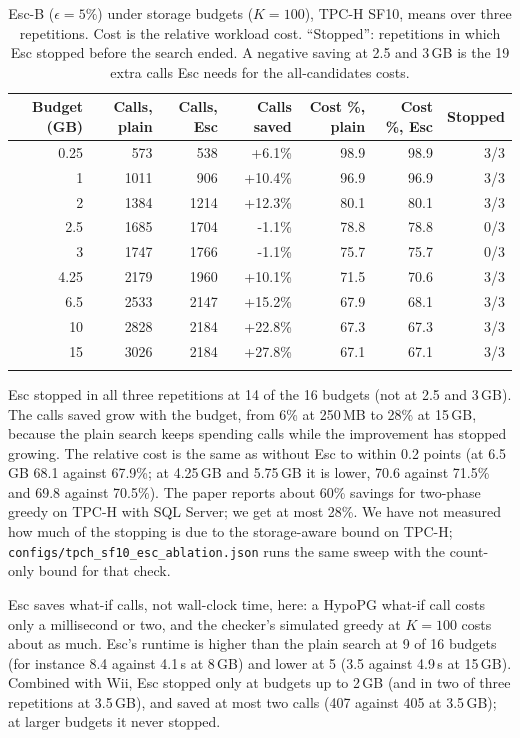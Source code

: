 \documentclass[11pt,a4paper]{article}
\begin{document}
\begin{table}[h]\centering\small
\begin{tabular}{rrrrrrr}\toprule
Budget (GB) & Calls, plain & Calls, Esc & Calls saved & Cost \%, plain & Cost \%, Esc & Stopped\\\midrule
0.25 & 573 & 538 & +6.1\% & 98.9 & 98.9 & 3/3\\
1 & 1011 & 906 & +10.4\% & 96.9 & 96.9 & 3/3\\
2 & 1384 & 1214 & +12.3\% & 80.1 & 80.1 & 3/3\\
2.5 & 1685 & 1704 & -1.1\% & 78.8 & 78.8 & 0/3\\
3 & 1747 & 1766 & -1.1\% & 75.7 & 75.7 & 0/3\\
4.25 & 2179 & 1960 & +10.1\% & 71.5 & 70.6 & 3/3\\
6.5 & 2533 & 2147 & +15.2\% & 67.9 & 68.1 & 3/3\\
10 & 2828 & 2184 & +22.8\% & 67.3 & 67.3 & 3/3\\
15 & 3026 & 2184 & +27.8\% & 67.1 & 67.1 & 3/3\\\\\bottomrule
\end{tabular}
\caption{Esc-B ($\epsilon=5\%$) under storage budgets ($K=100$), TPC-H SF10, means over three repetitions. Cost is the relative workload cost. ``Stopped'': repetitions in which Esc stopped before the search ended. A negative saving at 2.5 and 3\,GB is the 19 extra calls Esc needs for the all-candidates costs.}\label{tab:escstorage}
\end{table}

Esc stopped in all three repetitions at 14 of the 16 budgets (not at 2.5 and 3\,GB). The calls saved grow with the budget, from 6\% at 250\,MB to 28\% at 15\,GB, because the plain search keeps spending calls while the improvement has stopped growing. The relative cost is the same as without Esc to within 0.2 points (at 6.5\,GB 68.1 against 67.9\%; at 4.25\,GB and 5.75\,GB it is lower, 70.6 against 71.5\% and 69.8 against 70.5\%). The paper reports about 60\% savings for two-phase greedy on TPC-H with SQL Server; we get at most 28\%. We have not measured how much of the stopping is due to the storage-aware bound on TPC-H; \texttt{configs/tpch\_sf10\_esc\_ablation.json} runs the same sweep with the count-only bound for that check.

Esc saves what-if calls, not wall-clock time, here: a HypoPG what-if call costs only a millisecond or two, and the checker's simulated greedy at $K=100$ costs about as much. Esc's runtime is higher than the plain search at 9 of 16 budgets (for instance 8.4 against 4.1\,s at 8\,GB) and lower at 5 (3.5 against 4.9\,s at 15\,GB). Combined with Wii, Esc stopped only at budgets up to 2\,GB (and in two of three repetitions at 3.5\,GB), and saved at most two calls (407 against 405 at 3.5\,GB); at larger budgets it never stopped.
\end{document}
